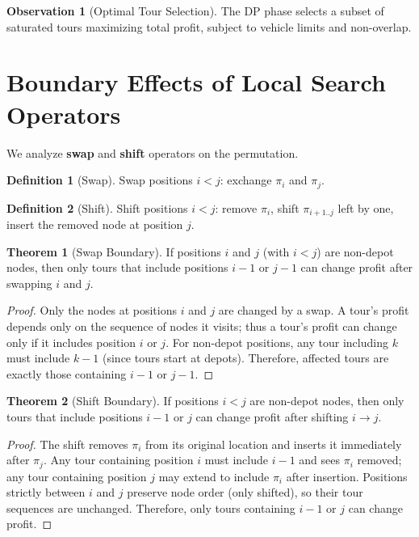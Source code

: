 \documentclass[11pt]{article}
\theoremstyle{definition}
\newtheorem{definition}{Definition}[section]
\newtheorem{theorem}{Theorem}[section]
\newtheorem{observation}{Observation}[section]
\begin{document}
\begin{observation}[Optimal Tour Selection]
The DP phase selects a subset of saturated tours maximizing total profit, subject to vehicle limits and non-overlap.
\end{observation}

\section{Boundary Effects of Local Search Operators}

We analyze \textbf{swap} and \textbf{shift} operators on the permutation.

\begin{definition}[Swap]
Swap positions $i < j$: exchange $\pi_i$ and $\pi_j$.
\end{definition}

\begin{definition}[Shift]
Shift positions $i < j$: remove $\pi_i$, shift $\pi_{i+1..j}$ left by one, insert the removed node at position $j$.
\end{definition}

\begin{theorem}[Swap Boundary]
If positions $i$ and $j$ (with $i < j$) are non-depot nodes, then only tours that include positions $i-1$ or $j-1$ can change profit after swapping $i$ and $j$.
\end{theorem}

\begin{proof}
Only the nodes at positions $i$ and $j$ are changed by a swap. A tour's profit depends only on the sequence of nodes it visits; thus a tour's profit can change only if it includes position $i$ or $j$. For non-depot positions, any tour including $k$ must include $k-1$ (since tours start at depots). Therefore, affected tours are exactly those containing $i-1$ or $j-1$.
\end{proof}

\begin{theorem}[Shift Boundary]
If positions $i < j$ are non-depot nodes, then only tours that include positions $i-1$ or $j$ can change profit after shifting $i \to j$.
\end{theorem}

\begin{proof}
The shift removes $\pi_i$ from its original location and inserts it immediately after $\pi_j$. Any tour containing position $i$ must include $i-1$ and sees $\pi_i$ removed; any tour containing position $j$ may extend to include $\pi_i$ after insertion. Positions strictly between $i$ and $j$ preserve node order (only shifted), so their tour sequences are unchanged. Therefore, only tours containing $i-1$ or $j$ can change profit.
\end{proof}
\end{document}

